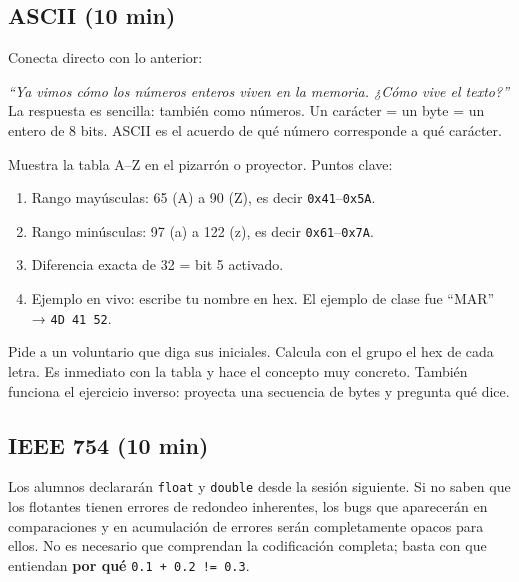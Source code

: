 \documentclass[12pt, oneside]{article}
\begin{document}
\subsection{ASCII (10 min)}

Conecta directo con lo anterior:

\begin{notaprofesor}
  \textit{``Ya vimos cómo los números enteros viven en la memoria.
  ¿Cómo vive el texto?''} La respuesta es sencilla: también como números.
  Un carácter = un byte = un entero de 8 bits. ASCII es el acuerdo de
  qué número corresponde a qué carácter.
\end{notaprofesor}

Muestra la tabla A–Z en el pizarrón o proyector. Puntos clave:

\begin{enumerate}
  \item Rango mayúsculas: 65 (A) a 90 (Z), es decir \texttt{0x41}–\texttt{0x5A}.
  \item Rango minúsculas: 97 (a) a 122 (z), es decir \texttt{0x61}–\texttt{0x7A}.
  \item Diferencia exacta de 32 = bit 5 activado.
  \item Ejemplo en vivo: escribe tu nombre en hex. El ejemplo de clase fue ``MAR''
        → \texttt{4D 41 52}.
\end{enumerate}

\begin{notaprofesor}
  Pide a un voluntario que diga sus iniciales. Calcula con el grupo el hex
  de cada letra. Es inmediato con la tabla y hace el concepto muy concreto.
  También funciona el ejercicio inverso: proyecta una secuencia de bytes
  y pregunta qué dice.
\end{notaprofesor}

\subsection{IEEE 754 (10 min)}

\begin{notaprofesor}
  Los alumnos declararán \texttt{float} y \texttt{double} desde la
  sesión siguiente. Si no saben que los flotantes tienen errores de
  redondeo inherentes, los bugs que aparecerán en comparaciones y en
  acumulación de errores serán completamente opacos para ellos.
  No es necesario que comprendan la codificación completa; basta con que
  entiendan \textbf{por qué} \texttt{0.1 + 0.2 != 0.3}.
\end{notaprofesor}
\end{document}
